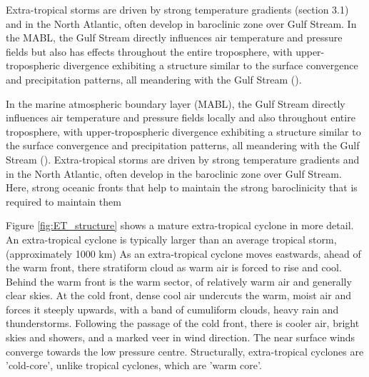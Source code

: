 Extra-tropical storms are driven by strong temperature gradients (section 3.1) and in the North Atlantic, often develop in baroclinic zone over Gulf Stream. In the MABL, the Gulf Stream directly influences air temperature and pressure fields but also has effects throughout the entire troposphere, with upper-tropospheric divergence exhibiting a structure similar to the surface convergence and precipitation patterns, all meandering with the Gulf Stream (\citep{minobe2008influence}).


In the marine atmospheric boundary layer (MABL), the Gulf Stream directly influences air temperature and pressure fields locally and also throughout entire troposphere, with upper-tropospheric divergence exhibiting a structure similar to the surface convergence and precipitation patterns, all meandering with the Gulf Stream (\cite{minobe2008influence}). Extra-tropical storms are driven by strong temperature gradients and in the North Atlantic, often develop in the baroclinic zone over Gulf Stream. Here, strong oceanic fronts that help to maintain the strong baroclinicity that is required to maintain them \citep{nakamura2004observed, nakamura2008importance, hoskins1990existence}



Figure \ref{fig:ET_structure} shows a mature extra-tropical cyclone in more detail. An extra-tropical cyclone is typically larger than an average tropical storm, (approximately 1000 km)
As an extra-tropical cyclone moves eastwards, ahead of the warm front, there stratiform cloud as warm air is forced to rise and cool. Behind the warm front is the warm sector, of relatively warm air and generally clear skies. At the cold front, dense cool air undercuts the warm, moist air and forces it steeply upwards, with a band of cumuliform clouds, heavy rain and thunderstorms. Following the passage of the cold front, there is cooler air, bright skies and showers, and a marked veer in wind direction. The near surface winds converge towards the low pressure centre. Structurally, extra-tropical cyclones are 'cold-core', unlike tropical cyclones, which are 'warm core'.

